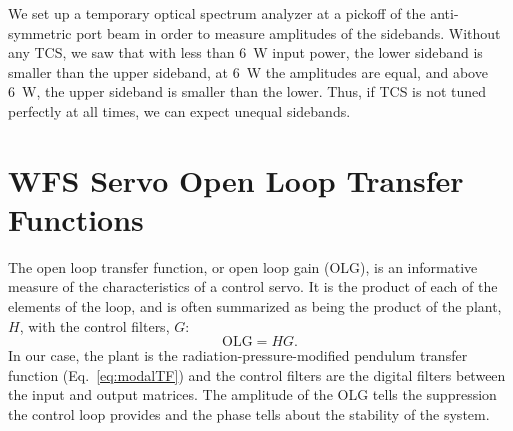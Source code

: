 We set up a temporary optical spectrum analyzer at a pickoff of the
anti-symmetric port beam in order to measure amplitudes of the
sidebands. Without any TCS, we saw that with less than 6~W input
power, the lower sideband is smaller than the upper sideband, at 6~W
the amplitudes are equal, and above 6~W, the upper sideband is smaller
than the lower. Thus, if TCS is not tuned perfectly at all times, we
can expect unequal sidebands.










\section{WFS Servo Open Loop Transfer Functions}
\label{sec:WFSolgs}

The open loop transfer function, or open loop gain (OLG), is an
informative measure of the characteristics of a control servo. It is
the product of each of the elements of the loop, and is often
summarized as being the product of the plant, $H$, with the control
filters, $G$:
\begin{equation}
\mathrm{OLG} = HG.
\end{equation}
In our case, the plant is the radiation-pressure-modified pendulum
transfer function (Eq.~\ref{eq:modalTF}) and the control filters are
the digital filters between the input and output matrices. The
amplitude of the OLG tells the suppression the control loop provides
and the phase tells about the stability of the system.

